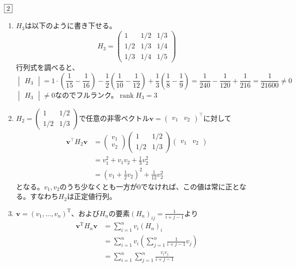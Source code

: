 \documentclass[dvipdfmx]{jsreport}
\DeclareMathOperator{\rank}{rank}
\newcommand{\tr}[1]{{#1}^\intercal}
\newcounter{num}[section]
\begin{document}
\begin{answer} %
	$\fbox{2}$
\begin{enumerate}
	\item $H_3$は以下のように書き下せる。
\begin{equation*}
	H_3= 
\begin{pmatrix}
	1& 1/2& 1/3\\
	1/2& 1/3& 1/4\\
	1/3& 1/4& 1/5
\end{pmatrix}
\end{equation*}
	行列式を調べると、
\begin{equation*}
	\begin{vmatrix}H_3\end{vmatrix}= 1\cdot \left(\frac{1}{15}- \frac{1}{16}\right)- \frac{1}{2}\left(\frac{1}{10}- \frac{1}{12}\right)+ \frac{1}{3}\left(\frac{1}{8}- \frac{1}{9}\right)= \frac{1}{240}- \frac{1}{120}+ \frac{1}{216}= \frac{1}{21600}\ne 0
\end{equation*}
	$\begin{vmatrix}H_3\end{vmatrix}\ne 0$なのでフルランク。$\rank{H_3}= 3$

	\item $H_2= \begin{pmatrix}1& 1/2\\ 1/2& 1/3\end{pmatrix}$で任意の非零ベクトル$\bm{v}= \tr{\begin{pmatrix}v_1& v_2\end{pmatrix}}$に対して
\begin{align*}
	\tr{\bm{v}}H_2\bm{v}
	&= \begin{pmatrix}v_1\\ v_2\end{pmatrix}\begin{pmatrix}1& 1/2\\ 1/2& 1/3\end{pmatrix}\begin{pmatrix}v_1& v_2\end{pmatrix}\\
	&= v_1^2+ v_1v_2+ \frac{1}{3}v_2^2\\
	&= \left(v_1+ \frac{1}{2}v_2\right)^2+ \frac{1}{12}v_2^2
\end{align*}
	となる。$v_1, v_2$のうち少なくとも一方が0でなければ、この値は常に正となる。すなわち$H_2$は正定値行列。

	\item $\bm{v}= (v_1, \ldots, v_n)^\mathrm{T}$、および$H_n$の要素$(H_n)_{ij}= \frac{1}{i+ j- 1}$より
\begin{align*}
	\bm{v}^\mathrm{T}H_n\bm{v}
	&= \sum_{i= 1}^n v_i (H_n)_i\\
	&= \sum_{i= 1}^n v_i\left(\sum_{j= 1}^n \frac{1}{i+ j- 1}v_j\right)\\
	&= \sum_{i= 1}^n \sum_{j= 1}^n\frac{v_i v_j}{i+ j- 1}
\end{align*}


\end{enumerate}
\end{answer}
\end{document}
